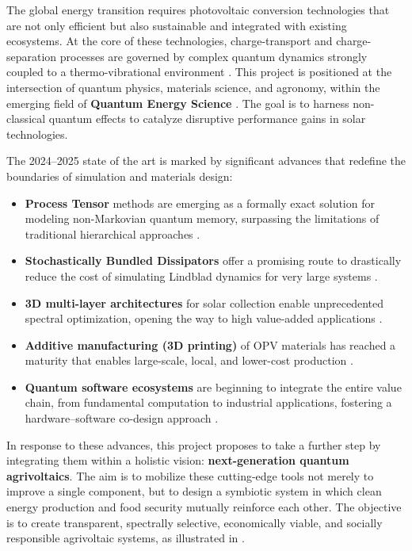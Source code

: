 \documentclass[12pt, a4paper]{article}
\begin{document}
The global energy transition requires photovoltaic conversion technologies that are not only efficient but also sustainable and integrated with existing ecosystems. At the core of these technologies, charge-transport and charge-separation processes are governed by complex quantum dynamics strongly coupled to a thermo-vibrational environment \cite{ye2012, mohs2008}. This project is positioned at the intersection of quantum physics, materials science, and agronomy, within the emerging field of \textbf{Quantum Energy Science} \cite{Metzler2023}. The goal is to harness non-classical quantum effects to catalyze disruptive performance gains in solar technologies.

The 2024–2025 state of the art is marked by significant advances that redefine the boundaries of simulation and materials design:
\begin{itemize}
  \item \textbf{Process Tensor} methods are emerging as a formally exact solution for modeling non-Markovian quantum memory, surpassing the limitations of traditional hierarchical approaches \cite{keeling2025}.

  \item \textbf{Stochastically Bundled Dissipators} offer a promising route to drastically reduce the cost of simulating Lindblad dynamics for very large systems \cite{Adhikari2025}.

  \item \textbf{3D multi-layer architectures} for solar collection enable unprecedented spectral optimization, opening the way to high value-added applications \cite{shi2025a}.

  \item \textbf{Additive manufacturing (3D printing)} of OPV materials has reached a maturity that enables large-scale, local, and lower-cost production \cite{ju2025}.

  \item \textbf{Quantum software ecosystems} are beginning to integrate the entire value chain, from fundamental computation to industrial applications, fostering a hardware–software co-design approach \cite{basermann2024}.
\end{itemize}

In response to these advances, this project proposes to take a further step by integrating them within a holistic vision: \textbf{next-generation quantum agrivoltaics}. The aim is to mobilize these cutting-edge tools not merely to improve a single component, but to design a symbiotic system in which clean energy production and food security mutually reinforce each other. The objective is to create transparent, spectrally selective, economically viable, and socially responsible agrivoltaic systems, as illustrated in .
\end{document}
